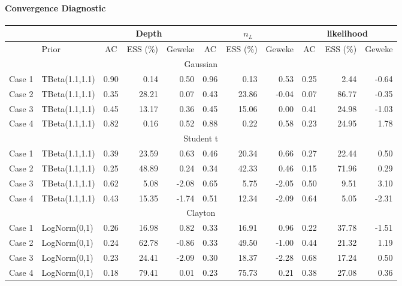 \documentclass{amsart}
\begin{document}
\paragraph{Convergence Diagnostic}
\begin{table}[ht]
	\centering
	\scriptsize{
		\begin{tabular}{ll|crr|crr|crr}
			\toprule
			\multicolumn{2}{c|}{} &
			\multicolumn{3}{c|}{Depth} &
			\multicolumn{3}{c|}{$n_L$} &
			\multicolumn{3}{c}{likelihood} \\
			\midrule
			& Prior & AC & ESS (\%) & Geweke & AC & ESS (\%) & Geweke & AC & ESS (\%) & Geweke \\ 
			\midrule
			\multicolumn{11}{c}{Gaussian} \\
			\midrule
			Case 1 & TBeta(1.1,1.1) & 0.90 & 0.14 & 0.50 & 0.96 & 0.13 & 0.53 & 0.25 & 2.44 & -0.64 \\ 
			Case 2 & TBeta(1.1,1.1) & 0.35 & 28.21 & 0.07 & 0.43 & 23.86 & -0.04 & 0.07 & 86.77 & -0.35 \\ 
			Case 3 & TBeta(1.1,1.1) & 0.45 & 13.17 & 0.36 & 0.45 & 15.06 & 0.00 & 0.41 & 24.98 & -1.03 \\ 
			Case 4 & TBeta(1.1,1.1) & 0.82 & 0.16 & 0.52 & 0.88 & 0.22 & 0.58 & 0.23 & 24.95 & 1.78 \\ 
			\midrule
			\multicolumn{11}{c}{Student t} \\
			\midrule
			Case 1 & TBeta(1.1,1.1) & 0.39 & 23.59 & 0.63 & 0.46 & 20.34 & 0.66 & 0.27 & 22.44 & 0.50 \\ 
			Case 2 & TBeta(1.1,1.1) & 0.25 & 48.89 & 0.24 & 0.34 & 42.33 & 0.46 & 0.15 & 71.96 & 0.29 \\ 
			Case 3 & TBeta(1.1,1.1) & 0.62 & 5.08 & -2.08 & 0.65 & 5.75 & -2.05 & 0.50 & 9.51 & 3.10 \\ 
			Case 4 & TBeta(1.1,1.1) & 0.43 & 15.35 & -1.74 & 0.51 & 12.34 & -2.09 & 0.64 & 5.05 & -2.31 \\ 
			\midrule
			\multicolumn{11}{c}{Clayton} \\
			\midrule
			Case 1 & LogNorm(0,1) & 0.26 & 16.98 & 0.82 & 0.33 & 16.91 & 0.96 & 0.22 & 37.78 & -1.51 \\ 
			Case 2 & LogNorm(0,1) & 0.24 & 62.78 & -0.86 & 0.33 & 49.50 & -1.00 & 0.44 & 21.32 & 1.19 \\ 
			Case 3 & LogNorm(0,1) & 0.23 & 24.41 & -2.09 & 0.30 & 18.37 & -2.28 & 0.68 & 17.24 & 0.50 \\ 
			Case 4 & LogNorm(0,1) & 0.18 & 79.41 & 0.01 & 0.23 & 75.73 & 0.21 & 0.38 & 27.08 & 0.36 \\ 

\end{tabular}}
\end{table}
\end{document}
